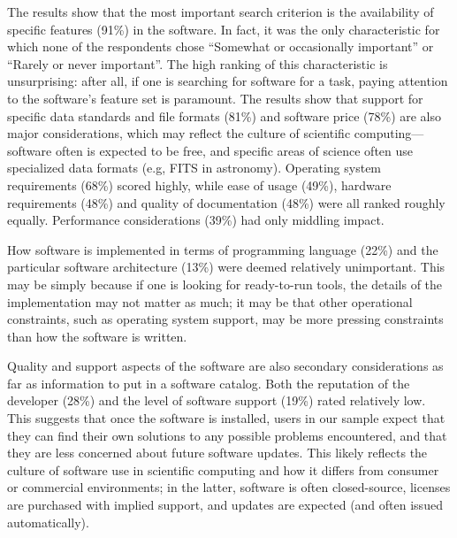 \documentclass{casicswhitepaper}
\begin{document}


The results show that the most important search criterion is the availability of specific features (91\%) in the software.  In fact, it was the only characteristic for which none of the respondents chose ``Somewhat or occasionally important'' or ``Rarely or never important''.  The high ranking of this characteristic is unsurprising: after all, if one is searching for software for a task, paying attention to the software's feature set is paramount.  The results show that support for specific data standards and file formats (81\%) and software price (78\%) are also major considerations, which may reflect the culture of scientific computing---software often is expected to be free, and specific areas of science often use specialized data formats (e.g, FITS in astronomy).  Operating system requirements (68\%) scored highly, while ease of usage (49\%), hardware requirements (48\%) and quality of documentation (48\%) were all ranked roughly equally.  Performance considerations (39\%) had only middling impact.

How software is implemented in terms of programming language (22\%) and the particular software architecture (13\%) were deemed relatively unimportant.  This may be simply because if one is looking for ready-to-run tools, the details of the implementation may not matter as much; it may be that other operational constraints, such as operating system support, may be more pressing constraints than how the software is written.


Quality and support aspects of the software are also secondary considerations as far as information to put in a software catalog.  Both the reputation of the developer (28\%) and the level of software support (19\%) rated relatively low.  This suggests that once the software is installed, users in our sample expect that they can find their own solutions to any possible problems encountered, and that they are less concerned about future software updates. This likely reflects the culture of software use in scientific computing and how it differs from consumer or commercial environments; in the latter, software is often closed-source, licenses are purchased with implied support, and updates are expected (and often issued automatically).
\end{document}
